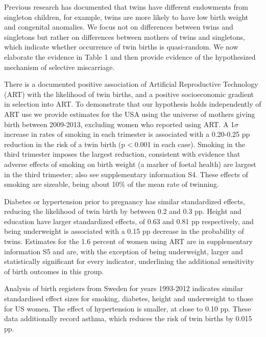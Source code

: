 \documentclass{nature}
\begin{document}
\begin{linenumbers}
Previous research has documented that twins have different endowments from singleton children, for example, twins are more likely to have low birth weight and congenital anomalies\cite{Hall2003}. We focus not on differences between twins and singletons but rather on differences between mothers of twins and singletons, which indicate whether occurrence of twin births is quasi-random. We now elaborate the evidence in Table 1 and then provide evidence of the hypothesized mechanism of selective miscarriage.

There is a documented positive association of Artificial Reproductive Technology (ART) with the likelihood of twin births\cite{Vitthalaetal2009}, and a positive socioeconomic gradient in selection into ART. To demonstrate that our hypothesis holds independently of ART use we provide estimates for the USA using the universe of mothers giving birth between 2009-2013, excluding women who reported using ART. A 1$\sigma$ increase in rates of smoking in each trimester is associated with a 0.20-0.25 pp reduction in the risk of a twin birth (p$<$0.001 in each case). Smoking in the third trimester imposes the largest reduction, consistent with evidence that adverse effects of smoking on birth weight (a marker of foetal health) are largest in the third trimester\cite{Bernsteinetal2005}; also see supplementary information S4.  
These effects of smoking are sizeable, being about 10\% of the mean rate of twinning. 

Diabetes or hypertension prior to pregnancy has similar standardized effects, reducing the likelihood of twin birth by between 0.2 and 0.3 pp. Height and education have larger standardized effects, of 0.63 and 0.81 pp respectively, and being underweight is associated with a 0.15 pp decrease in the probability of twins. Estimates for the 1.6 percent of women using ART are in supplementary information S5 and are, with the exception of being underweight, larger and statistically significant for every indicator, underlining the additional sensitivity of birth outcomes in this group.

Analysis of birth registers from Sweden for years 1993-2012 indicates similar standardised effect sizes for smoking, diabetes, height and underweight to those for US women. The effect of hypertension is smaller, at close to 0.10 pp. These data additionally record asthma, which reduces the risk of twin births by 0.015 pp.



\end{linenumbers}
\end{document}
